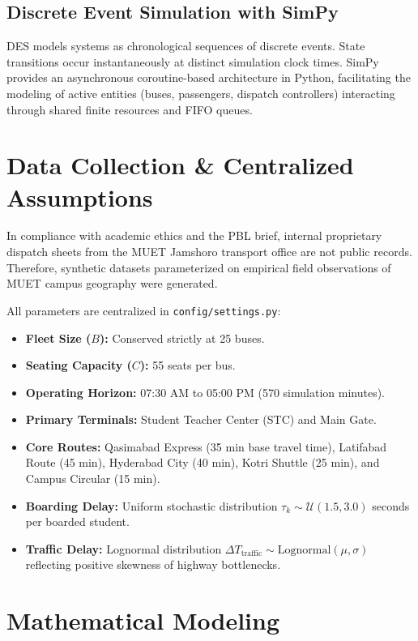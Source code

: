 \documentclass[conference]{IEEEtran}
\begin{document}
\subsection{Discrete Event Simulation with SimPy}
DES models systems as chronological sequences of discrete events. State transitions occur instantaneously at distinct simulation clock times. SimPy provides an asynchronous coroutine-based architecture in Python, facilitating the modeling of active entities (buses, passengers, dispatch controllers) interacting through shared finite resources and FIFO queues.

\section{Data Collection \& Centralized Assumptions}
In compliance with academic ethics and the PBL brief, internal proprietary dispatch sheets from the MUET Jamshoro transport office are not public records. Therefore, synthetic datasets parameterized on empirical field observations of MUET campus geography were generated. 

All parameters are centralized in \texttt{config/settings.py}:
\begin{itemize}
    \item \textbf{Fleet Size ($B$):} Conserved strictly at 25 buses.
    \item \textbf{Seating Capacity ($C$):} 55 seats per bus.
    \item \textbf{Operating Horizon:} 07:30 AM to 05:00 PM (570 simulation minutes).
    \item \textbf{Primary Terminals:} Student Teacher Center (STC) and Main Gate.
    \item \textbf{Core Routes:} Qasimabad Express (35 min base travel time), Latifabad Route (45 min), Hyderabad City (40 min), Kotri Shuttle (25 min), and Campus Circular (15 min).
    \item \textbf{Boarding Delay:} Uniform stochastic distribution $\tau_k \sim \mathcal{U}(1.5, 3.0)$ seconds per boarded student.
    \item \textbf{Traffic Delay:} Lognormal distribution $\Delta T_{\text{traffic}} \sim \text{Lognormal}(\mu, \sigma)$ reflecting positive skewness of highway bottlenecks.
\end{itemize}

\section{Mathematical Modeling}
\end{document}
